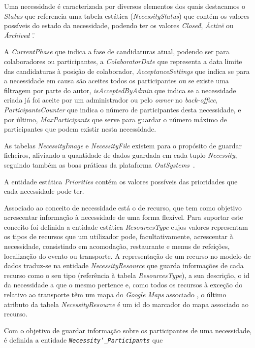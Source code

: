  
Uma necessidade é caracterizada por diversos elementos dos quais destacamos o \textit{Status} que referencia uma tabela estática (\textit{NecessityStatus}) que contém os valores possíveis do estado da necessidade, 
podendo ter os valores \textit{\" Closed\"}, \textit{\" Active\" } ou \textit{\" Archived \".} 
\par
A \textit{CurrentPhase} que indica a fase de candidaturas atual, 
podendo ser para colaboradores ou participantes, a \textit{ColaboratorDate} que representa a data limite das candidaturas 
à posição de colaborador, \textit{AcceptanceSettings} que indica se para a necessidade em causa são aceites todos os participantes ou se existe uma filtragem por parte do autor, 
\textit{isAcceptedByAdmin} que indica se a necessidade criada já foi aceite por um administrador ou pelo \textit{owner} no \textit{back-office}, 
\textit{ParticipantsCounter} que indica o número de participantes desta necessidade, e por último, \textit{MaxParticipants} que serve para guardar o número máximo de participantes que podem existir nesta necessidade. 
\par
As tabelas \textit{NecessityImage} e \textit{NecessityFile} existem para o propósito de guardar ficheiros, 
aliviando a quantidade de dados guardada em cada tuplo \textit{Necessity}, 
seguindo também as boas práticas da plataforma \textit{OutSystems~\cite{outsystems}}.
\par
A entidade estática \textit{Priorities} contém os valores possíveis das prioridades que cada necessidade pode ter.
\par
Associado ao conceito de necessidade está o de recurso, que tem como objetivo acrescentar informação à necessidade de uma forma flexível. 
Para suportar este conceito foi definida a entidade estática \textit{ResourcesType} cujos valores representam os tipos de recursos que um utilizador pode, facultativamente, acrescentar à necessidade, consistindo em acomodação, restaurante e menus de refeições, localização do evento ou transporte. 
A representação de um recurso no modelo de dados traduz-se na entidade \textit{NecessityResource} que guarda informações de cada recurso como o seu tipo (referência à tabela  \textit{ResourcesType}), a sua descrição, o id da necessidade a que o mesmo pertence e, como todos os recursos à exceção do relativo ao transporte têm um mapa do \textit{Google Maps} associado
, o último atributo da tabela \textit{NecessityResource} é um id do marcador do mapa associado ao recurso.
\par
Com o objetivo de guardar informação sobre os participantes de uma necessidade, é definida a entidade \texttt{\textit{Necessity\char`_Participants}} que 

